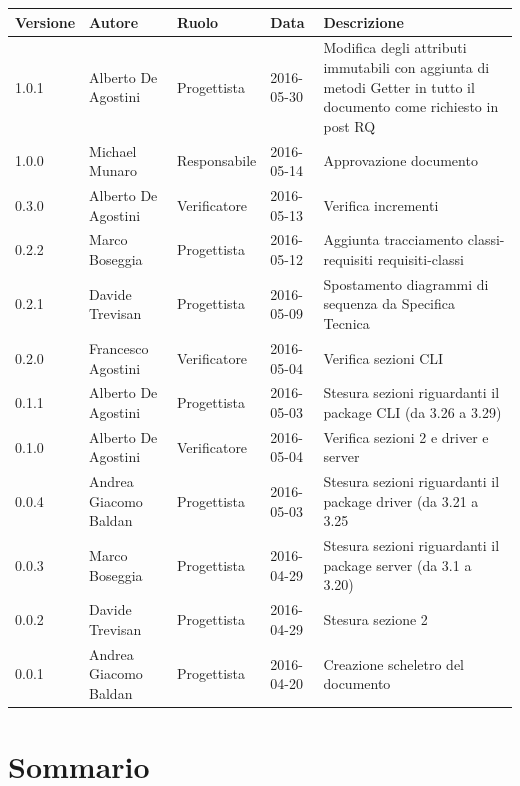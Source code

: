 \documentclass{scalatekids-article}
\begin{document}
\begin{center}
  \begin{longtable}{| l | l | l | l | p{5cm} |}
    \hline
    Versione & Autore & Ruolo & Data & Descrizione \\
    \hline
    1.0.1 & Alberto De Agostini & Progettista & 2016-05-30 & Modifica degli attributi immutabili con aggiunta di metodi Getter in tutto il documento come richiesto in post RQ\\
    \hline
    1.0.0 & Michael Munaro & Responsabile & 2016-05-14 & Approvazione documento\\
    \hline
    0.3.0 & Alberto De Agostini & Verificatore & 2016-05-13 & Verifica incrementi\\
    \hline
    0.2.2 & Marco Boseggia & Progettista & 2016-05-12 & Aggiunta tracciamento classi-requisiti requisiti-classi\\
    \hline
    0.2.1 & Davide Trevisan & Progettista & 2016-05-09 & Spostamento diagrammi di sequenza da Specifica Tecnica\\
    \hline
    0.2.0 & Francesco Agostini & Verificatore & 2016-05-04 & Verifica sezioni CLI\\
    \hline
    0.1.1 & Alberto De Agostini & Progettista & 2016-05-03 & Stesura sezioni riguardanti il package CLI (da 3.26 a 3.29)\\
    \hline
    0.1.0 & Alberto De Agostini & Verificatore & 2016-05-04 & Verifica sezioni 2 e driver e server\\
    \hline
    0.0.4 & Andrea Giacomo Baldan & Progettista & 2016-05-03 & Stesura sezioni riguardanti il package driver (da 3.21 a 3.25\\
    \hline
    0.0.3 & Marco Boseggia & Progettista & 2016-04-29 & Stesura sezioni riguardanti il package server (da 3.1 a 3.20)\\
    \hline
    0.0.2 & Davide Trevisan & Progettista & 2016-04-29 & Stesura sezione 2\\
    \hline
    0.0.1 & Andrea Giacomo Baldan & Progettista & 2016-04-20 & Creazione scheletro del documento\\
    \hline
  \end{longtable}
\end{center}
\newpage
\tableofcontents
\newpage
{}

\section{Sommario}
\end{document}
